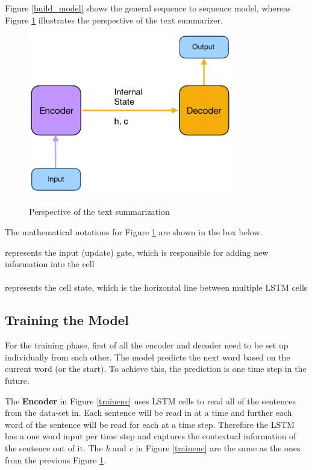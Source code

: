 Figure \ref{build_model} shows the general sequence to sequence model, whereas Figure \ref{modelenc} illustrates the perspective of the text summarizer. 

\begin{figure}
	\begin{center}
		\includegraphics[width=3.5in]{photos/modelenc-1}\\
		\caption{Perspective of the text summarization}\label{modelenc}
	\end{center}
\end{figure}

The mathematical notations for Figure \ref{modelenc} are shown in the box below.

\begin{tcolorbox}
	 represents the input (update) gate, which is responsible for adding new information into the cell \\ \\
	 represents the cell state, which is the horizontal line between multiple LSTM cells
\end{tcolorbox}

\subsection{Training the Model}

For the training phase, first of all the encoder and decoder need to be set up individually from each other. The model predicts the next word based on the current word (or the start). To achieve this, the prediction is one time step in the future. 

The \textbf{Encoder} in Figure \ref{trainenc} uses LSTM cells to read all of the sentences from the data-set in. Each sentence will be read in at a time and further each word of the sentence will be read for each at a time step. Therefore the LSTM has a one word input per time step and captures the contextual information of the sentence out of it.  The \textit{h} and \textit{c} in Figure \ref{trainenc} are the same as the ones from the previous Figure \ref{modelenc}. 

